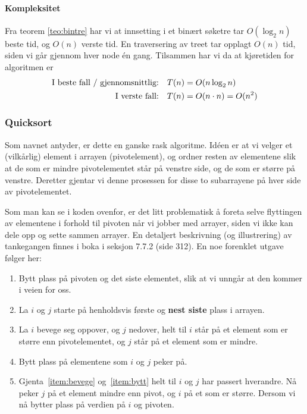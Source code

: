 \paragraph{Kompleksitet}
Fra teorem \ref{teo:bintre} har vi at innsetting i et binært søketre tar $ O(\log_2 n) $ beste tid, og $ O(n) $ verste tid. En traversering av treet tar opplagt $ O(n) $ tid, siden vi går gjennom hver node én gang. Tilsammen har vi da at kjøretiden for algoritmen er 
\begin{align*}
\text{I beste fall / gjennomsnittlig:\quad} & T(n) = O(n\log_2 n)\\
\text{I verste fall:\quad} & T(n) = O(n\cdot n) = O(n^2)
\end{align*}


\subsubsection{Quicksort}
\label{quick}
Som navnet antyder, er dette en ganske rask algoritme.
Idéen er at vi velger et (vilkårlig) element i arrayen (pivotelement), og ordner resten av
elementene slik at de som er mindre pivotelementet står på venstre side, og de
som er større på venstre. Deretter gjentar vi denne prosessen for disse to
subarrayene på hver side av pivotelementet.


Som man kan se i koden ovenfor, er det litt problematisk å foreta selve
flyttingen av elementene i forhold til pivoten når vi jobber med arrayer, siden
vi ikke kan dele opp og sette sammen arrayer. En detaljert beskrivning (og
illustrering) av tankegangen finnes i boka i seksjon 7.7.2 (side 312). 
En noe forenklet utgave følger her:
\begin{enumerate}
\item Bytt plass på pivoten og det siste elementet, slik at vi unngår at den
  kommer i veien for oss.
\item La $i$ og $j$ starte på henholdsvis første og \textbf{nest siste} plass i
  arrayen. 
\item\label{item:bevege} La $i$ bevege seg oppover, og $j$ nedover, helt til $i$ står på et
  element som er større enn pivotelementet, og $j$ står på et element som er
  mindre.
\item\label{item:bytt} Bytt plass på elementene som $i$ og $j$ peker på.
\item Gjenta~\ref{item:bevege} og~\ref{item:bytt} helt til $i$ og $j$ har
  passert hverandre. Nå peker $j$ på et element mindre enn pivot, og $i$ på et
  som er større. Dersom vi nå bytter plass på verdien på $i$ og pivoten.
\end{enumerate}

